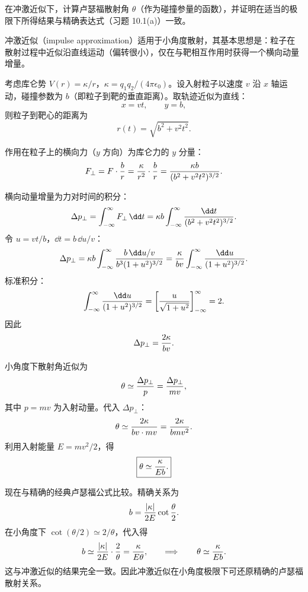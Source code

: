 \begin{question}
在冲激近似下，计算卢瑟福散射角 $\theta$（作为碰撞参量的函数），并证明在适当的极限下所得结果与精确表达式（习题 10.1(a)）一致。
\end{question}
\begin{solution}
冲激近似（impulse approximation）适用于小角度散射，其基本思想是：粒子在散射过程中近似沿直线运动（偏转很小），仅在与靶相互作用时获得一个横向动量增量。

考虑库仑势 $V(r)=\kappa/r$，$\kappa=q_1q_2/(4\pi\epsilon_0)$。设入射粒子以速度 $v$ 沿 $x$ 轴运动，碰撞参数为 $b$（即粒子到靶的垂直距离）。取轨迹近似为直线：
\[
x=vt,\qquad y=b,
\]
则粒子到靶心的距离为
\[
r(t)=\sqrt{b^2+v^2t^2}.
\]

作用在粒子上的横向力（$y$ 方向）为库仑力的 $y$ 分量：
\[
F_\perp=F\cdot{b\over r}
={\kappa\over r^2}\cdot{b\over r}
={\kappa b\over(b^2+v^2t^2)^{3/2}}.
\]

横向动量增量为力对时间的积分：
\[
\Delta p_\perp=\int_{-\infty}^{\infty}F_\perp\,\dd t
=\kappa b\int_{-\infty}^{\infty}{\dd t\over(b^2+v^2t^2)^{3/2}}.
\]
令 $u=vt/b$，$\dd t=b\,\dd u/v$：
\[
\Delta p_\perp=\kappa b\int_{-\infty}^{\infty}{b\,\dd u/v\over b^3(1+u^2)^{3/2}}
={\kappa\over bv}\int_{-\infty}^{\infty}{\dd u\over(1+u^2)^{3/2}}.
\]
标准积分：
\[
\int_{-\infty}^{\infty}{\dd u\over(1+u^2)^{3/2}}
=\left[{u\over\sqrt{1+u^2}}\right]_{-\infty}^{\infty}=2.
\]
因此
\[
\Delta p_\perp={2\kappa\over bv}.
\]

小角度下散射角近似为
\[
\theta\simeq{\Delta p_\perp\over p}={\Delta p_\perp\over mv},
\]
其中 $p=mv$ 为入射动量。代入 $\Delta p_\perp$：
\[
\theta\simeq{2\kappa\over bv\cdot mv}={2\kappa\over bmv^2}.
\]
利用入射能量 $E=mv^2/2$，得
\[
\boxed{\theta\simeq{\kappa\over Eb}.}
\]

现在与精确的经典卢瑟福公式比较。精确关系为
\[
b={|\kappa|\over2E}\cot{\theta\over2}.
\]
在小角度下 $\cot(\theta/2)\simeq 2/\theta$，代入得
\[
b\simeq{|\kappa|\over2E}\cdot{2\over\theta}={\kappa\over E\theta},
\qquad\Longrightarrow\qquad\theta\simeq{\kappa\over Eb}.
\]
这与冲激近似的结果完全一致。因此冲激近似在小角度极限下可还原精确的卢瑟福散射关系。
\end{solution}

